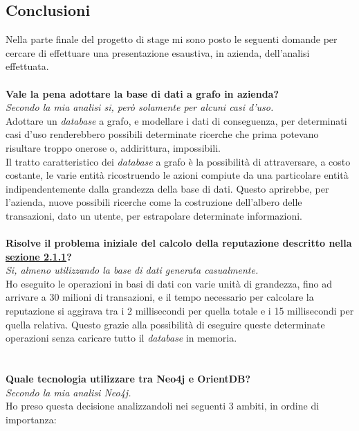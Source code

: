 \subsection{Conclusioni}
Nella parte finale del progetto di stage mi sono posto le seguenti domande per cercare di effettuare una presentazione esaustiva, in azienda, dell'analisi effettuata.\\
\\
\textbf{Vale la pena adottare la base di dati a grafo in azienda?}\\
\textit{Secondo la mia analisi si, però solamente per alcuni casi d'uso.}\\
Adottare un \textit{database} a grafo, e modellare i dati di conseguenza, per determinati casi d'uso renderebbero possibili determinate ricerche che prima potevano risultare troppo onerose o, addirittura, impossibili.\\
Il tratto caratteristico dei \textit{database} a grafo è la possibilità di attraversare, a costo costante, le varie entità ricostruendo le azioni compiute da una particolare entità indipendentemente dalla grandezza della base di dati. Questo aprirebbe, per l'azienda, nuove possibili ricerche come la costruzione dell'albero delle transazioni, dato un utente, per estrapolare determinate informazioni.\\
\\
\textbf{Risolve il problema iniziale del calcolo della reputazione descritto nella \hyperlink{sec:prob}{sezione 2.1.1}?}\\
\textit{Si, almeno utilizzando la base di dati generata casualmente.}\\
Ho eseguito le operazioni in basi di dati con varie unità di grandezza, fino ad arrivare a 30 milioni di transazioni, e il tempo necessario per calcolare la reputazione si aggirava tra i 2 millisecondi per quella totale e i 15 millisecondi per quella relativa. Questo grazie alla possibilità di eseguire queste determinate operazioni senza caricare tutto il \textit{database} in memoria.\\
\\
\\
\textbf{Quale tecnologia utilizzare tra Neo4j e OrientDB?}\\
\textit{Secondo la mia analisi Neo4j.}\\
Ho preso questa decisione analizzandoli nei seguenti 3 ambiti, in ordine di importanza:
